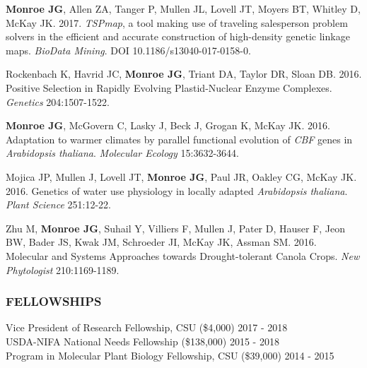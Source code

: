 \documentclass[12pt,english]{article}
\begin{document}
\begin{hangparas}{.5in}{1}
\vspace{1ex}\par
\hspace{1em}  \textbf{Monroe JG}, Allen ZA, Tanger P, Mullen JL, Lovell JT, Moyers BT, Whitley D, McKay JK. 2017. \textit{TSPmap}, a tool making use of traveling salesperson problem solvers in the efficient and accurate construction of high-density genetic linkage maps. \textit{BioData Mining}. DOI 10.1186/s13040-017-0158-0.
\vspace{1ex}\par
\hspace{1em} Rockenbach K, Havrid JC, \textbf{Monroe JG}, Triant DA, Taylor DR, Sloan DB. 2016. Positive Selection in Rapidly Evolving Plastid-Nuclear Enzyme Complexes. \textit{Genetics} 204:1507-1522.
\vspace{1ex}\par
\hspace{1em} \textbf{Monroe JG}, McGovern C, Lasky J, Beck J, Grogan K, McKay JK. 2016. Adaptation to warmer climates by parallel functional evolution of \textit{CBF} genes in \textit{Arabidopsis thaliana}. \textit{Molecular Ecology} 15:3632-3644.
\vspace{1ex}\par
\hspace{1em} Mojica JP, Mullen J, Lovell JT, \textbf{Monroe JG}, Paul JR, Oakley CG, McKay JK. 2016. Genetics of water use physiology in locally adapted \textit{Arabidopsis thaliana}. \textit{Plant Science}  251:12-22.
\vspace{1ex}\par
\hspace{1em} Zhu M, \textbf{Monroe JG}, Suhail Y, Villiers F, Mullen J, Pater D, Hauser F, Jeon BW, Bader JS, Kwak JM, Schroeder JI, McKay JK, Assman SM. 2016. Molecular and Systems Approaches towards Drought-tolerant Canola Crops. \textit{New Phytologist} 210:1169-1189.
\end{hangparas}
\vspace{1ex}


\subsubsection*{FELLOWSHIPS}
\vspace{-0.5ex}
\hspace*{1.0em} Vice President of Research Fellowship, CSU (\$4,000)
\hfill
2017 - 2018
\vspace{1ex}\\
\hspace*{1.0em} USDA-NIFA National Needs Fellowship (\$138,000)
\hfill
2015 - 2018
\vspace{1ex}\\
\hspace*{1.0em} Program in Molecular Plant Biology Fellowship, CSU (\$39,000)
\hfill
2014 - 2015
\vspace{1ex}
\end{document}
